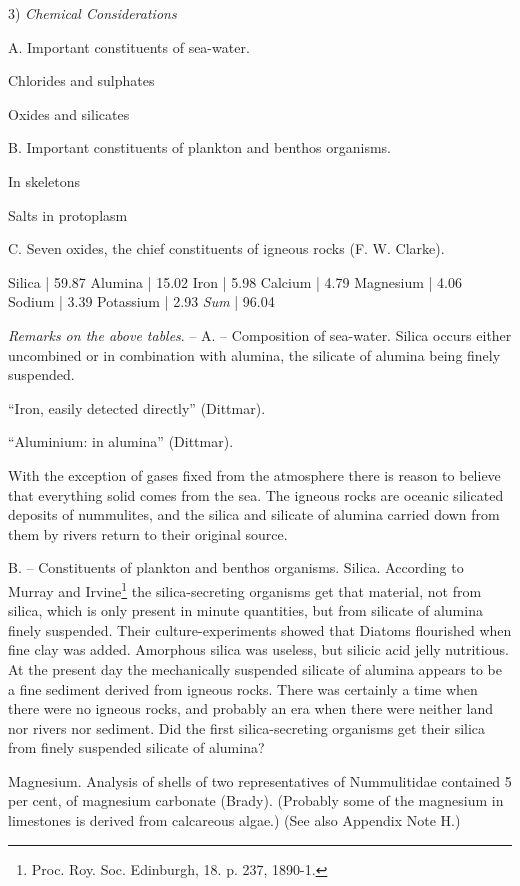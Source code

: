 \documentclass[a4paper, 12pt, oneside]{article}
\begin{document}
3) \emph{Chemical Considerations}

A. Important constituents of sea-water.

Chlorides and sulphates  

Oxides and silicates  

B. Important constituents of plankton and benthos organisms.

In skeletons  

Salts in protoplasm  

C. Seven oxides, the chief constituents of igneous rocks (F. W. Clarke).

Silica | 59.87  
Alumina | 15.02  
Iron | 5.98  
Calcium | 4.79  
Magnesium | 4.06  
Sodium | 3.39  
Potassium | 2.93  
\emph{Sum} | 96.04  

\emph{Remarks on the above tables}. -- A. -- Composition of sea-water. Silica occurs either uncombined or in combination with alumina, the silicate of alumina being finely suspended.

``Iron, easily detected directly'' (Dittmar).

``Aluminium: in alumina'' (Dittmar).

With the exception of gases fixed from the atmosphere there is reason to believe that everything solid comes from the sea. The igneous rocks are oceanic silicated deposits of nummulites, and the silica and silicate of alumina carried down from them by rivers return to their original source.

B. -- Constituents of plankton and benthos organisms. Silica. According to Murray and Irvine\footnote{Proc. Roy. Soc. Edinburgh, 18. p. 237, 1890-1.} the silica-secreting organisms get that material, not from silica, which is only present in minute quantities, but from silicate of alumina finely suspended. Their culture-experiments showed that Diatoms flourished when fine clay was added. Amorphous silica was useless, but silicic acid jelly nutritious. At the present day the mechanically suspended silicate of alumina appears to be a fine sediment derived from igneous rocks. There was certainly a time when there were no igneous rocks, and probably an era when there were neither land nor rivers nor sediment. Did the first silica-secreting organisms get their silica from finely suspended silicate of alumina?

Magnesium. Analysis of shells of two representatives of Nummulitidae contained 5 per cent, of magnesium carbonate (Brady). (Probably some of the magnesium in limestones is derived from calcareous algae.) (See also Appendix Note H.)
\end{document}
